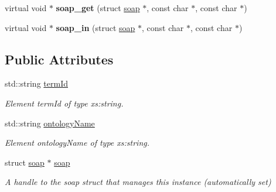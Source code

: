 \begin{DoxyCompactItemize}
\item 
\hypertarget{class__ns1____isObsolete_a59c0362035fed41b4ff14e437262b4b9}{
virtual void $\ast$ {\bfseries soap\_\-get} (struct \hyperlink{class__ns1____isObsolete_a32fbc137d310a506421592c6eb9cd6f1}{soap} $\ast$, const char $\ast$, const char $\ast$)}
\label{class__ns1____isObsolete_a59c0362035fed41b4ff14e437262b4b9}

\item 
\hypertarget{class__ns1____isObsolete_a3dd931af30e93eaadc6313b6b3b86d5a}{
virtual void $\ast$ {\bfseries soap\_\-in} (struct \hyperlink{class__ns1____isObsolete_a32fbc137d310a506421592c6eb9cd6f1}{soap} $\ast$, const char $\ast$, const char $\ast$)}
\label{class__ns1____isObsolete_a3dd931af30e93eaadc6313b6b3b86d5a}

\end{DoxyCompactItemize}
\subsection*{Public Attributes}
\begin{DoxyCompactItemize}
\item 
std::string \hyperlink{class__ns1____isObsolete_a66347d6b9ed4732f844146f3e57dac64}{termId}
\begin{DoxyCompactList}\small\item\em Element termId of type xs:string. \end{DoxyCompactList}\item 
std::string \hyperlink{class__ns1____isObsolete_aaaa439bfa9c95f7b3a6742a7b63b5fd2}{ontologyName}
\begin{DoxyCompactList}\small\item\em Element ontologyName of type xs:string. \end{DoxyCompactList}\item 
\hypertarget{class__ns1____isObsolete_a32fbc137d310a506421592c6eb9cd6f1}{
struct \hyperlink{class__ns1____isObsolete_a32fbc137d310a506421592c6eb9cd6f1}{soap} $\ast$ \hyperlink{class__ns1____isObsolete_a32fbc137d310a506421592c6eb9cd6f1}{soap}}
\label{class__ns1____isObsolete_a32fbc137d310a506421592c6eb9cd6f1}

\begin{DoxyCompactList}\small\item\em A handle to the soap struct that manages this instance (automatically set) \end{DoxyCompactList}\end{DoxyCompactItemize}


